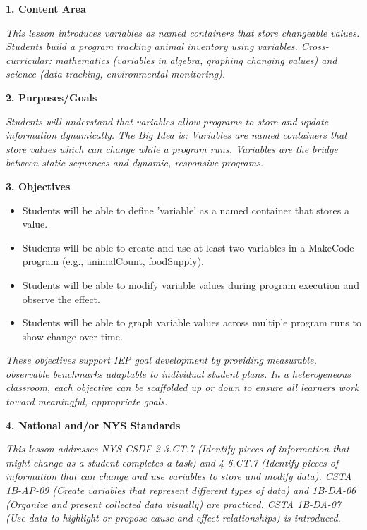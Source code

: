 \documentclass[11pt,letterpaper]{article}
\begin{document}
\textbf{1. Content Area}

\textit{This lesson introduces variables as named containers that store changeable values. Students build a program tracking animal inventory using variables. Cross-curricular: mathematics (variables in algebra, graphing changing values) and science (data tracking, environmental monitoring).}

\textbf{2. Purposes/Goals}

\textit{Students will understand that variables allow programs to store and update information dynamically. The Big Idea is: Variables are named containers that store values which can change while a program runs. Variables are the bridge between static sequences and dynamic, responsive programs.}

\textbf{3. Objectives}

\begin{itemize}
  \item Students will be able to define 'variable' as a named container that stores a value.

  \item Students will be able to create and use at least two variables in a MakeCode program (e.g., animalCount, foodSupply).

  \item Students will be able to modify variable values during program execution and observe the effect.

  \item Students will be able to graph variable values across multiple program runs to show change over time.
\end{itemize}

\textit{These objectives support IEP goal development by providing measurable, observable benchmarks adaptable to individual student plans. In a heterogeneous classroom, each objective can be scaffolded up or down to ensure all learners work toward meaningful, appropriate goals.}

\textbf{4. National and/or NYS Standards}

\textit{This lesson addresses NYS CSDF 2-3.CT.7 (Identify pieces of information that might change as a student completes a task) and 4-6.CT.7 (Identify pieces of information that can change and use variables to store and modify data). CSTA 1B-AP-09 (Create variables that represent different types of data) and 1B-DA-06 (Organize and present collected data visually) are practiced. CSTA 1B-DA-07 (Use data to highlight or propose cause-and-effect relationships) is introduced.}
\end{document}
